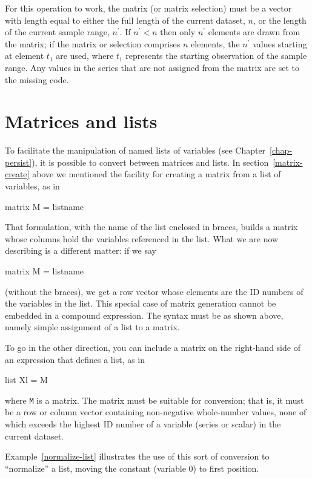 For this operation to work, the matrix (or matrix selection) must be a
vector with length equal to either the full length of the current
dataset, $n$, or the length of the current sample range, $n^{\prime}$.
If $n^{\prime} < n$ then only $n^{\prime}$ elements are drawn from the
matrix; if the matrix or selection comprises $n$ elements, the
$n^{\prime}$ values starting at element $t_1$ are used, where $t_1$
represents the starting observation of the sample range.  Any values
in the series that are not assigned from the matrix are set to the
missing code.


\section{Matrices and lists}
\label{matrix-and-list}

To facilitate the manipulation of named lists of variables (see
Chapter~\ref{chap-persist}), it is possible to convert between
matrices and lists.  In section~\ref{matrix-create} above we mentioned
the facility for creating a matrix from a list of variables, as in
%
\begin{code}
matrix M = { listname }
\end{code}
%
That formulation, with the name of the list enclosed in braces, builds
a matrix whose columns hold the variables referenced in the list.
What we are now describing is a different matter: if we say
%
\begin{code}
matrix M = listname
\end{code}
%
(without the braces), we get a row vector whose elements are
the ID numbers of the variables in the list.  This special case
of matrix generation cannot be embedded in a compound
expression.  The syntax must be as shown above, namely simple
assignment of a list to a matrix.

To go in the other direction, you can include a matrix on the
right-hand side of an expression that defines a list, as in
%
\begin{code}
list Xl = M
\end{code}
%
where \texttt{M} is a matrix.  The matrix must be suitable for
conversion; that is, it must be a row or column vector containing
non-negative whole-number values, none of which exceeds the highest ID
number of a variable (series or scalar) in the current dataset.

Example~\ref{normalize-list} illustrates the use of this sort of
conversion to ``normalize'' a list, moving the constant (variable 0)
to first position.

